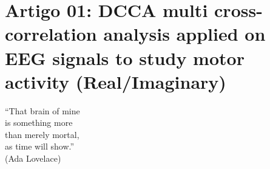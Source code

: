 \chapter{Artigo 01: DCCA multi cross-correlation analysis applied on EEG signals to study motor
activity (Real/Imaginary)}
\label{cap:paper_01}

\begin{flushright}
    ``That brain of mine \\
    is something more\\
    than merely mortal,\\
    as time will show.''\\
    (Ada Lovelace)
    \end{flushright}

    


% 

